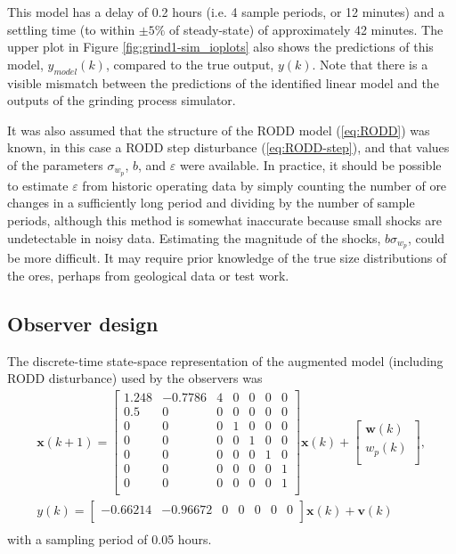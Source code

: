 This model has a delay of 0.2 hours (i.e. 4 sample periods, or 12 minutes) and a settling time (to within $\pm5\%$ of steady-state) of approximately 42 minutes. The upper plot in Figure \ref{fig:grind1-sim_ioplots} also shows the predictions of this model, $y_{model}(k)$, compared to the true output, $y(k)$. Note that there is a visible mismatch between the predictions of the identified linear model and the outputs of the grinding process simulator.

It was also assumed that the structure of the \gls{RODD} model (\ref{eq:RODD}) was known, in this case a \gls{RODD} step disturbance (\ref{eq:RODD-step}), and that values of the parameters $\sigma_{w_p}$, $b$, and $\varepsilon$ were available. In practice, it should be possible to estimate $\varepsilon$ from historic operating data by simply counting the number of ore changes in a sufficiently long period and dividing by the number of sample periods, although this method is somewhat inaccurate because small shocks are undetectable in noisy data. Estimating the magnitude of the shocks, $b\sigma_{w_p}$, could be more difficult. It may require prior knowledge of the true size distributions of the ores, perhaps from geological data or test work.

\subsection{Observer design} \label{sec:grind1-obs-design}

The discrete-time state-space representation of the augmented model (including \gls{RODD} disturbance) used by the observers was
\begin{multline} \label{eq:grind1-obs_ss_model}
	\mathbf{x}(k+1) = 
	\begin{bmatrix}
		1.248 & -0.7786 & 4 & 0 & 0 & 0 & 0 \\
		0.5   &  0      & 0 & 0 & 0 & 0 & 0 \\
		0     &  0      & 0 & 1 & 0 & 0 & 0 \\
		0     &  0      & 0 & 0 & 1 & 0 & 0 \\
		0     &  0      & 0 & 0 & 0 & 1 & 0 \\
		0     &  0      & 0 & 0 & 0 & 0 & 1 \\
		0     &  0      & 0 & 0 & 0 & 0 & 1 \\
	\end{bmatrix} \mathbf{x}(k)
	+ \begin{bmatrix}
		\mathbf{w}(k) \\
		w_p(k) \\
	\end{bmatrix}, \\
	y(k) = 
	\begin{bmatrix}
		-0.66214 & -0.96672 & 0 & 0 & 0 & 0 & 0 \\
	\end{bmatrix} \mathbf{x}(k) + \mathbf{v}(k) \\
\end{multline}
with a sampling period of 0.05 hours.

